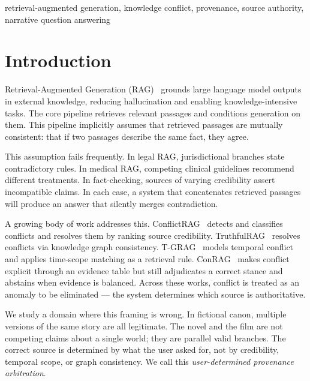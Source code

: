 \documentclass[conference]{IEEEtran}
\begin{document}
\begin{IEEEkeywords}
retrieval-augmented generation, knowledge conflict, provenance, source authority, narrative question answering
\end{IEEEkeywords}

\section{Introduction}

Retrieval-Augmented Generation (RAG)~\cite{lewis2020} grounds large language model outputs in external knowledge, reducing hallucination and enabling knowledge-intensive tasks. The core pipeline retrieves relevant passages and conditions generation on them. This pipeline implicitly assumes that retrieved passages are mutually consistent: that if two passages describe the same fact, they agree.

This assumption fails frequently. In legal RAG, jurisdictional branches state contradictory rules. In medical RAG, competing clinical guidelines recommend different treatments. In fact-checking, sources of varying credibility assert incompatible claims. In each case, a system that concatenates retrieved passages will produce an answer that silently merges contradiction.

A growing body of work addresses this. ConflictRAG~\cite{conflictrag} detects and classifies conflicts and resolves them by ranking source credibility. TruthfulRAG~\cite{truthfulrag} resolves conflicts via knowledge graph consistency. T-GRAG~\cite{tgrag} models temporal conflict and applies time-scope matching as a retrieval rule. ConRAG~\cite{conrag} makes conflict explicit through an evidence table but still adjudicates a correct stance and abstains when evidence is balanced. Across these works, conflict is treated as an anomaly to be eliminated --- the system determines which source is authoritative.

We study a domain where this framing is wrong. In fictional canon, multiple versions of the same story are all legitimate. The novel and the film are not competing claims about a single world; they are parallel valid branches. The correct source is determined by what the user asked for, not by credibility, temporal scope, or graph consistency. We call this \emph{user-determined provenance arbitration}.
\end{document}
